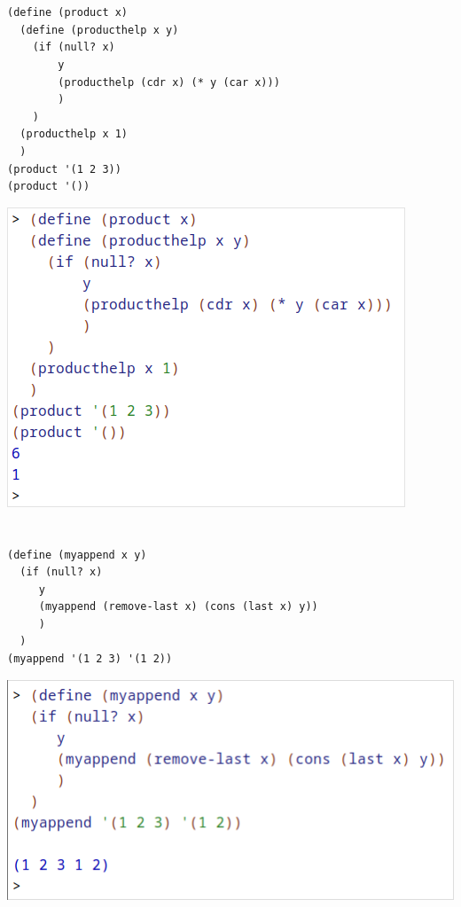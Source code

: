 \documentclass{article}
\begin{document}
	\section{}
	\begin{verbatim}
(define (product x)
  (define (producthelp x y)
    (if (null? x)
        y
        (producthelp (cdr x) (* y (car x)))
        )
    )
  (producthelp x 1)
  )
(product '(1 2 3))
(product '())
	\end{verbatim}
		\includegraphics[scale=0.6]{product.png}

	\newpage
	\section{}
	\begin{verbatim}
(define (myappend x y)
  (if (null? x)
     y
     (myappend (remove-last x) (cons (last x) y))
     )
  )
(myappend '(1 2 3) '(1 2))
	\end{verbatim}
		\includegraphics[scale=0.6]{myappend.png}
\end{document}
